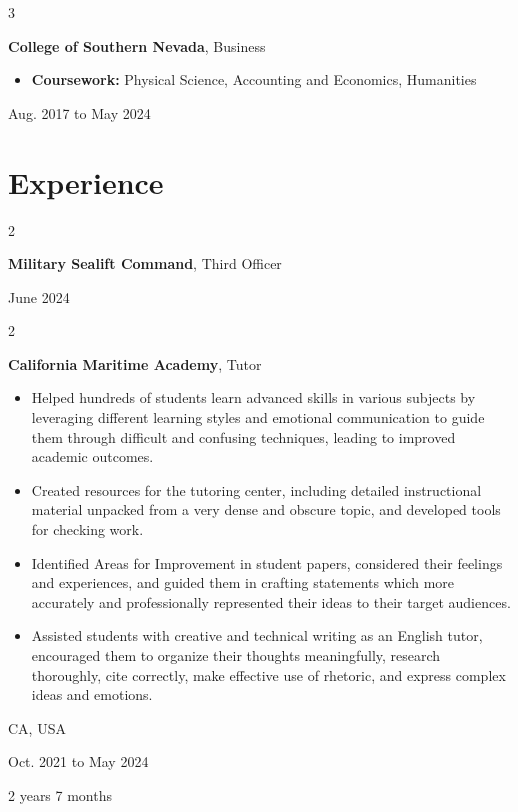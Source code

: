\documentclass[10pt, letterpaper]{article}
\newenvironment{highlights}{
    \begin{itemize}[
        topsep=0.10 cm,
        parsep=0.10 cm,
        partopsep=0pt,
        itemsep=0pt,
        leftmargin=0.4 cm + 10pt
    ]
}{
    \end{itemize}
} %
\newenvironment{twocolentry}[2][]{
    \onecolentry
    \def\secondColumn{#2}
    \setcolumnwidth{\fill, 4.5 cm}
    \begin{paracol}{2}
}{
    \switchcolumn \raggedleft \secondColumn
    \end{paracol}
    \endonecolentry
} %
\newenvironment{threecolentry}[3][]{
    \onecolentry
    \def\thirdColumn{#3}
    \setcolumnwidth{1 cm, \fill, 4.5 cm}
    \begin{paracol}{3}
    {\raggedright #2} \switchcolumn
}{
    \switchcolumn \raggedleft \thirdColumn
    \end{paracol}
    \endonecolentry
} %
\begin{document}
        \begin{threecolentry}{\textbf{}}{
            Aug. 2017 to May 2024
        }
            \textbf{College of Southern Nevada}, Business
            \begin{highlights}
                \item \textbf{Coursework:} Physical Science, Accounting and Economics, Humanities
            \end{highlights}
        \end{threecolentry}


    
    \section{Experience}



        
        \begin{twocolentry}{
            June 2024
        }
            \textbf{Military Sealift Command}, Third Officer
        \end{twocolentry}


        \vspace{0.2 cm}

        \begin{twocolentry}{
            CA, USA

        Oct. 2021 to May 2024

        2 years 7 months
        }
            \textbf{California Maritime Academy}, Tutor
            \begin{highlights}
                \item Helped hundreds of students learn advanced skills in various subjects by leveraging different learning styles and emotional communication to guide them through difficult and confusing techniques, leading to improved academic outcomes.
                \item Created resources for the tutoring center, including detailed instructional material unpacked from a very dense and obscure topic, and developed tools for checking work.
                \item Identified Areas for Improvement in student papers, considered their feelings and experiences, and guided them in crafting statements which more accurately and professionally represented their ideas to their target audiences.
                \item Assisted students with creative and technical writing as an English tutor, encouraged them to organize their thoughts meaningfully, research thoroughly, cite correctly, make effective use of rhetoric, and express complex ideas and emotions.
            \end{highlights}
        \end{twocolentry}
\end{document}
